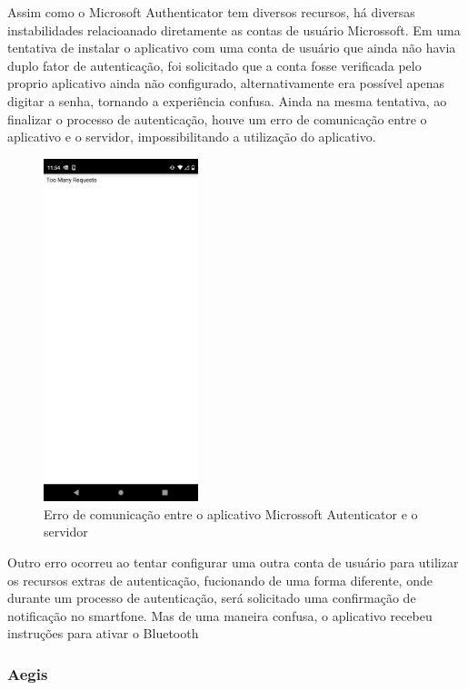 \documentclass[12pt]{article}
\begin{document}
Assim como o Microsoft Authenticator tem diversos recursos, há diversas instabilidades
relacioanado diretamente as contas de usuário Microssoft.
Em uma tentativa de instalar o aplicativo com uma conta de usuário que ainda não havia
duplo fator de autenticação, foi solicitado que a conta fosse verificada pelo proprio
aplicativo ainda não configurado, alternativamente era possível apenas digitar a senha,
tornando a experiência confusa.
Ainda na mesma tentativa, ao finalizar o processo de autenticação, houve um erro de
comunicação entre o aplicativo e o servidor, impossibilitando a utilização do aplicativo.

\begin{figure}[ht]
  \centering
  \includegraphics[width=0.4\textwidth]{./assets/microssoft_error_1.jpg}
  \caption{Erro de comunicação entre o aplicativo Microssoft Autenticator e o servidor}
  \label{fig:MicrossoftAutenticatorErrorToManyReequests}
\end{figure}

Outro erro ocorreu ao tentar configurar uma outra conta de usuário para utilizar os
recursos extras de autenticação, fucionando de uma forma diferente, onde durante um
processo de autenticação, será solicitado uma confirmação de notificação no smartfone.
Mas de uma maneira confusa, o aplicativo recebeu instruções para ativar o Bluetooth

\subsubsection{Aegis}
\end{document}
